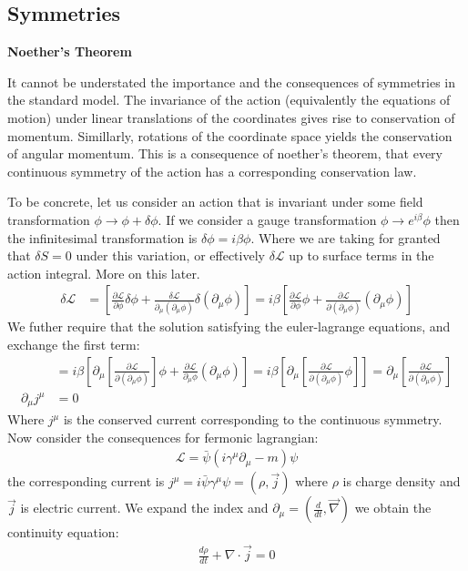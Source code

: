 \subsection{Symmetries}

\textbf{Noether's Theorem}

It cannot be understated the importance and the consequences of symmetries in the standard model. The
invariance of the action (equivalently the equations of motion) under linear translations of the  coordinates
gives rise to conservation of momentum. Simillarly,  rotations of the coordinate space
yields the conservation of angular momentum. This is a consequence of noether's theorem, that every 
continuous symmetry of the action has a corresponding conservation law. 

To be concrete, let us consider an action that is invariant under some field transformation
 $\phi \rightarrow \phi + \delta \phi$. If we consider a gauge transformation $\phi \rightarrow e^{i \beta}\phi$  
then the infinitesimal transformation is $\delta \phi = i \beta \phi$. Where we are taking for granted that $\delta S =0$ under
this variation, or effectively $\delta \mathcal{L}$ up to surface terms in the action integral. More on this later.
\begin{align*}
\delta \mathcal{L} &=  \left [ \frac{\partial \mathcal{L}}{\partial \phi} \delta \phi  + \frac{\delta \mathcal{L}}{\partial_\mu (\partial_\mu \phi)} \delta(\partial_\mu \phi) \right] =
 i\beta \left [ \frac{\partial \mathcal{L}}{\partial \phi}  \phi  + \frac{\partial \mathcal{L}}{\partial (\partial_\mu\phi)} (\partial_\mu \phi) \right]
\end{align*}
We futher require that the solution satisfying the euler-lagrange equations, and exchange the first term:
\begin{align*}
&= i\beta \left [ \partial_\mu\left [ \frac{\partial \mathcal{L}}{\partial(\partial_\mu \phi)} \right ]  \phi  + \frac{\partial \mathcal{L}}{\partial_\mu \phi} (\partial_\mu \phi) \right] = i\beta \left [ \partial_\mu  \left [  \frac{\partial \mathcal{L}}{\partial(\partial_\mu \phi)}   \phi  \right ] \right ] = \partial_\mu \left [ \frac{\partial \mathcal{L}}{\partial (\partial_\mu \phi) }\right ] \\
\partial_\mu j^\mu &= 0 
\end{align*}
Where $j^\mu$ is the conserved current corresponding to the continuous symmetry. Now consider the consequences for fermonic lagrangian:
\begin{align*}
\mathcal{L} = \bar{\psi}(i \gamma^\mu \partial_\mu -m)\psi
\end{align*}
the corresponding current is $j^\mu = i\bar \psi \gamma^\mu \psi = (\rho, \vec j)$ where $\rho$ is charge density and $\vec j$ is electric current.
We expand the index and $\partial_\mu = (\frac{d}{dt}, \vec \nabla)$ we obtain the continuity equation:
\begin{align*}
\frac{d\rho}{dt} + \nabla \cdot \vec j = 0
\end{align*}

